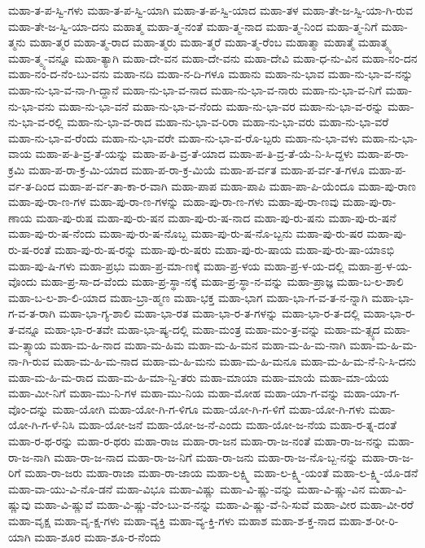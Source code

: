 {ಮಹಾ-ತ-ಪ-ಸ್ವಿ-ಗಳು
ಮಹಾ-ತ-ಪ-ಸ್ವಿ-ಯಾಗಿ
ಮಹಾ-ತ-ಪ-ಸ್ವಿ-ಯಾದ
ಮಹಾ-ತಳ
ಮಹಾ-ತೇ-ಜ-ಸ್ವಿ-ಯಾ-ಗಿ-ರುವ
ಮಹಾ-ತೇ-ಜ-ಸ್ವಿ-ಯಾ-ದನು
ಮಹಾತ್ಮ
ಮಹಾ-ತ್ಮ-ನಂತೆ
ಮಹಾ-ತ್ಮ-ನಾದ
ಮಹಾ-ತ್ಮ-ನಿಂದ
ಮಹಾ-ತ್ಮ-ನಿಗೆ
ಮಹಾ-ತ್ಮನು
ಮಹಾ-ತ್ಮರ
ಮಹಾ-ತ್ಮ-ರಾದ
ಮಹಾ-ತ್ಮರು
ಮಹಾ-ತ್ಮರೆ
ಮಹಾ-ತ್ಮ-ರೆಂಬ
ಮಹಾತ್ಮಾ
ಮಹಾತ್ಮೆ
ಮಹಾತ್ಮ್ಯ
ಮಹಾ-ತ್ಮ್ಯ-ವನ್ನೂ
ಮಹಾ-ತ್ಯಾಗಿ
ಮಹಾ-ದೇ-ವನ
ಮಹಾ-ದೇ-ವನು
ಮಹಾ-ದೇವಿ
ಮಹಾ-ಧ-ನು-ವಿನ
ಮಹಾ-ನಂ-ದನ
ಮಹಾ-ನಂ-ದ-ನೆಂ-ಬು-ವನು
ಮಹಾ-ನದಿ
ಮಹಾ-ನ-ದಿ-ಗಳೂ
ಮಹಾನು
ಮಹಾ-ನು-ಭಾವ
ಮಹಾ-ನು-ಭಾ-ವ-ನನ್ನು
ಮಹಾ-ನು-ಭಾ-ವ-ನಾ-ಗಿ-ದ್ದಾನೆ
ಮಹಾ-ನು-ಭಾ-ವ-ನಾದ
ಮಹಾ-ನು-ಭಾ-ವ-ನಾರು
ಮಹಾ-ನು-ಭಾ-ವ-ನಿಗೆ
ಮಹಾ-ನು-ಭಾ-ವನು
ಮಹಾ-ನು-ಭಾ-ವನೆ
ಮಹಾ-ನು-ಭಾ-ವ-ನೆಂದು
ಮಹಾ-ನು-ಭಾ-ವರ
ಮಹಾ-ನು-ಭಾ-ವ-ರನ್ನು
ಮಹಾ-ನು-ಭಾ-ವ-ರಲ್ಲಿ
ಮಹಾ-ನು-ಭಾ-ವ-ರಾದ
ಮಹಾ-ನು-ಭಾ-ವ-ರಿರಾ
ಮಹಾ-ನು-ಭಾ-ವರು
ಮಹಾ-ನು-ಭಾ-ವರೆ
ಮಹಾ-ನು-ಭಾ-ವ-ರೆಂದು
ಮಹಾ-ನು-ಭಾ-ವರೇ
ಮಹಾ-ನು-ಭಾ-ವ-ರೊ-ಬ್ಪರು
ಮಹಾ-ನು-ಭಾ-ವಳು
ಮಹಾ-ನು-ಭಾ-ವಾಯ
ಮಹಾ-ಪ-ತಿ-ವ್ರ-ತೆ-ಯನ್ನು
ಮಹಾ-ಪ-ತಿ-ವ್ರ-ತೆ-ಯಾದ
ಮಹಾ-ಪ-ತಿ-ವ್ರ-ತೆ-ಯೆ-ನಿ-ಸಿ-ದ್ದಳು
ಮಹಾ-ಪ-ರಾ-ಕ್ರಮಿ
ಮಹಾ-ಪ-ರಾ-ಕ್ರ-ಮಿ-ಯಾದ
ಮಹಾ-ಪ-ರಾ-ಕ್ರ-ಮಿಯೆ
ಮಹಾ-ಪ-ರ್ವತ
ಮಹಾ-ಪ-ರ್ವ-ತ-ಗಳೂ
ಮಹಾ-ಪ-ರ್ವ-ತ-ದಿಂದ
ಮಹಾ-ಪ-ರ್ವ-ತಾ-ಕಾ-ರ-ವಾಗಿ
ಮಹಾ-ಪಾಪ
ಮಹಾ-ಪಾಪಿ
ಮಹಾ-ಪಾ-ಪಿ-ಯೆಂದೂ
ಮಹಾ-ಪು-ರಾಣ
ಮಹಾ-ಪು-ರಾ-ಣ-ಗಳ
ಮಹಾ-ಪು-ರಾ-ಣ-ಗಳನ್ನು
ಮಹಾ-ಪು-ರಾ-ಣ-ಗಳು
ಮಹಾ-ಪು-ರಾ-ಣವು
ಮಹಾ-ಪು-ರಾ-ಣಾಯ
ಮಹಾ-ಪು-ರುಷ
ಮಹಾ-ಪು-ರು-ಷನ
ಮಹಾ-ಪು-ರು-ಷ-ನಾದ
ಮಹಾ-ಪು-ರು-ಷನು
ಮಹಾ-ಪು-ರು-ಷನೆ
ಮಹಾ-ಪು-ರು-ಷ-ನೆಂದು
ಮಹಾ-ಪು-ರು-ಷ-ನೊಬ್ಬ
ಮಹಾ-ಪು-ರು-ಷ-ನೊ-ಬ್ಬನು
ಮಹಾ-ಪು-ರು-ಷರ
ಮಹಾ-ಪು-ರು-ಷ-ರಂತೆ
ಮಹಾ-ಪು-ರು-ಷ-ರನ್ನು
ಮಹಾ-ಪು-ರು-ಷರು
ಮಹಾ-ಪು-ರು-ಷಾಯ
ಮಹಾ-ಪು-ರು-ಷಾ-ಯಾಽಭಿ
ಮಹಾ-ಪು-ಷಿ-ಗಳು
ಮಹಾ-ಪ್ರಭು
ಮಹಾ-ಪ್ರ-ಮಾ-ಣಕ್ಕೆ
ಮಹಾ-ಪ್ರ-ಳಯ
ಮಹಾ-ಪ್ರ-ಳ-ಯ-ದಲ್ಲಿ
ಮಹಾ-ಪ್ರ-ಳ-ಯ-ವೊಂದು
ಮಹಾ-ಪ್ರ-ಸಾ-ದ-ವೆಂದು
ಮಹಾ-ಪ್ರ-ಸ್ಥಾ-ನಕ್ಕೆ
ಮಹಾ-ಪ್ರ-ಸ್ಥಾ-ನ-ವನ್ನು
ಮಹಾ-ಪ್ರಾಜ್ಞ
ಮಹಾ-ಬ-ಲ-ಶಾಲಿ
ಮಹಾ-ಬ-ಲ-ಶಾ-ಲಿ-ಯಾದ
ಮಹಾ-ಬ್ರಾ-ಹ್ಮಣ
ಮಹಾ-ಭಕ್ತ
ಮಹಾ-ಭಾಗ
ಮಹಾ-ಭಾ-ಗ-ವ-ತ-ನ-ನ್ನಾಗಿ
ಮಹಾ-ಭಾ-ಗ-ವ-ತ-ರಾಗಿ
ಮಹಾ-ಭಾ-ಗ್ಯ-ಶಾಲಿ
ಮಹಾ-ಭಾ-ರತ
ಮಹಾ-ಭಾ-ರ-ತ-ಗಳನ್ನು
ಮಹಾ-ಭಾ-ರ-ತ-ದಲ್ಲಿ
ಮಹಾ-ಭಾ-ರ-ತ-ವನ್ನೂ
ಮಹಾ-ಭಾ-ರ-ತವೇ
ಮಹಾ-ಭಾ-ಷ್ಯ-ದಲ್ಲಿ
ಮಹಾ-ಮಂತ್ರ
ಮಹಾ-ಮಂ-ತ್ರ-ವನ್ನು
ಮಹಾ-ಮ-ತ್ಸ್ಯದ
ಮಹಾ-ಮ-ತ್ಸ್ಯಾಯ
ಮಹಾ-ಮ-ಹಿ-ನಾದ
ಮಹಾ-ಮ-ಹಿಮ
ಮಹಾ-ಮ-ಹಿ-ಮನ
ಮಹಾ-ಮ-ಹಿ-ಮ-ನಾಗಿ
ಮಹಾ-ಮ-ಹಿ-ಮ-ನಾ-ಗಿ-ರುವ
ಮಹಾ-ಮ-ಹಿ-ಮ-ನಾದ
ಮಹಾ-ಮ-ಹಿ-ಮನು
ಮಹಾ-ಮ-ಹಿ-ಮನೂ
ಮಹಾ-ಮ-ಹಿ-ಮ-ನೆ-ನಿ-ಸಿ-ದನು
ಮಹಾ-ಮ-ಹಿ-ಮ-ರಾದ
ಮಹಾ-ಮ-ಹಿ-ಮಾ-ನ್ವಿ-ತರು
ಮಹಾ-ಮಾಯಾ
ಮಹಾ-ಮಾಯೆ
ಮಹಾ-ಮಾ-ಯೆಯ
ಮಹಾ-ಮೀ-ನಿಗೆ
ಮಹಾ-ಮು-ನಿ-ಗಳ
ಮಹಾ-ಮು-ನಿಯ
ಮಹಾ-ಮೋಹ
ಮಹಾ-ಯಾ-ಗ-ವನ್ನು
ಮಹಾ-ಯಾ-ಗ-ವೊಂ-ದನ್ನು
ಮಹಾ-ಯೋಗಿ
ಮಹಾ-ಯೋ-ಗಿ-ಗ-ಳಿಗೂ
ಮಹಾ-ಯೋ-ಗಿ-ಗ-ಳಿಗೆ
ಮಹಾ-ಯೋ-ಗಿ-ಗಳು
ಮಹಾ-ಯೋ-ಗಿ-ಗ-ಳೆ-ನಿಸಿ
ಮಹಾ-ಯೋ-ಜನೆ
ಮಹಾ-ಯೋ-ಜ-ನೆ-ಎಂದು
ಮಹಾ-ಯೋ-ಜ-ನೆಯ
ಮಹಾ-ರ-ತ್ನ-ದಂತೆ
ಮಹಾ-ರ-ಥ-ರನ್ನು
ಮಹಾ-ರ-ಥರು
ಮಹಾ-ರಾಜ
ಮಹಾ-ರಾ-ಜನ
ಮಹಾ-ರಾ-ಜ-ನಂತೆ
ಮಹಾ-ರಾ-ಜ-ನನ್ನು
ಮಹಾ-ರಾ-ಜ-ನಾಗಿ
ಮಹಾ-ರಾ-ಜ-ನಾದ
ಮಹಾ-ರಾ-ಜ-ನಿಗೆ
ಮಹಾ-ರಾ-ಜನು
ಮಹಾ-ರಾ-ಜ-ನೊ-ಬ್ಬ-ನನ್ನು
ಮಹಾ-ರಾ-ಜ-ರಿಗೆ
ಮಹಾ-ರಾ-ಜರು
ಮಹಾ-ರಾಜಾ
ಮಹಾ-ರಾ-ಜಾಯ
ಮಹಾ-ಲಕ್ಷ್ಮಿ
ಮಹಾ-ಲ-ಕ್ಷ್ಮಿ-ಯಂತೆ
ಮಹಾ-ಲ-ಕ್ಷ್ಮಿ-ಯೊ-ಡನೆ
ಮಹಾ-ವಾ-ಯು-ವಿ-ನೊ-ಡನೆ
ಮಹಾ-ವಿಭೂ
ಮಹಾ-ವಿಷ್ಣು
ಮಹಾ-ವಿ-ಷ್ಣು-ವನ್ನು
ಮಹಾ-ವಿ-ಷ್ಣು-ವಿನ
ಮಹಾ-ವಿ-ಷ್ಣುವು
ಮಹಾ-ವಿ-ಷ್ಣುವೆ
ಮಹಾ-ವಿ-ಷ್ಣು-ವೆಂ-ಬು-ವ-ನನ್ನು
ಮಹಾ-ವಿ-ಷ್ಣು-ವೆ-ನಿ-ಸುವೆ
ಮಹಾ-ವೀರ
ಮಹಾ-ವೀ-ರರೆ
ಮಹಾ-ವೃಕ್ಷ
ಮಹಾ-ವೃ-ಕ್ಷ-ಗಳು
ಮಹಾ-ವ್ಯಕ್ತಿ
ಮಹಾ-ವ್ಯ-ಕ್ತಿ-ಗಳು
ಮಹಾಶ
ಮಹಾ-ಶ-ಕ್ತ-ನಾದ
ಮಹಾ-ಶ-ರೀ-ರಿ-ಯಾಗಿ
ಮಹಾ-ಶೂರ
ಮಹಾ-ಶೂ-ರ-ನೆಂದು
}
